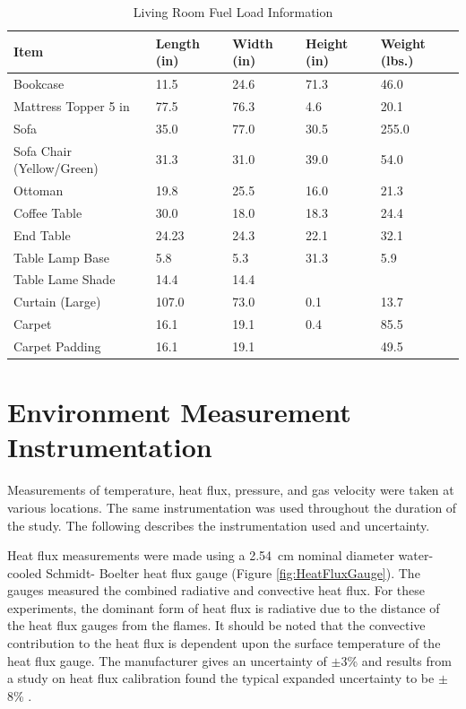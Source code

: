 \documentclass[12pt,oneside]{book}
\begin{document}
\begin{table}[H]
\centering
\begin{tabular}{|L{0.3\textwidth}|C{0.08\textwidth}|C{0.08\textwidth}|C{0.08\textwidth}|C{0.08\textwidth}|}
\hline
Item 						&Length (in) 	&Width (in) 	&Height (in) 	&Weight (lbs.) 	\\ \hline \hline
Bookcase 					&11.5 			&24.6	 		&71.3 			&46.0 			\\ \hline
Mattress Topper 5 in 		&77.5 			&76.3 			&4.6 			&20.1  			\\ \hline
Sofa 						&35.0 			&77.0 			&30.5 			&255.0 			\\ \hline
Sofa Chair (Yellow/Green) 	&31.3 			&31.0 			&39.0 			&54.0 			\\ \hline
Ottoman 					&19.8 			&25.5 			&16.0 			&21.3 			\\ \hline
Coffee Table 			 	&30.0 			&18.0 			&18.3 			&24.4 			\\ \hline
End Table 			 		&24.23 			&24.3 			&22.1	 		&32.1 			\\ \hline
Table Lamp Base 			&5.8 			&5.3 			&31.3 			&5.9 			\\ \hline
Table Lame Shade 			&14.4	 		&14.4	 		&  				&  				\\ \hline 
Curtain (Large) 			&107.0 			&73.0 			&0.1 			&13.7 			\\ \hline
Carpet 						&16.1			&19.1			&0.4			&85.5			\\ \hline
Carpet Padding 				&16.1			&19.1			&				&49.5			\\ \hline	
\end{tabular}
\caption{Living Room Fuel Load Information}
\label{table:lr_fuel_weights}
\end{table}

\clearpage

\section{Environment Measurement Instrumentation}

Measurements of temperature, heat flux, pressure, and gas velocity were taken at various locations. The same instrumentation was used throughout the duration of the study. The following describes the instrumentation used and uncertainty.

Heat flux measurements were made using a 2.54~cm nominal diameter water-cooled Schmidt- Boelter heat flux gauge (Figure \ref{fig:HeatFluxGauge}). The gauges measured the combined radiative and convective heat flux. For these experiments, the dominant form of heat flux is radiative due to the distance of the heat flux gauges from the flames. It should be noted that the convective contribution to the heat flux is dependent upon the surface temperature of the heat flux gauge. The manufacturer gives an uncertainty of $\pm$3\% and results from a study on heat flux calibration found the typical expanded uncertainty to be $\pm$8\% \cite{HeatFluxRoundRobin}. 
\end{document}
